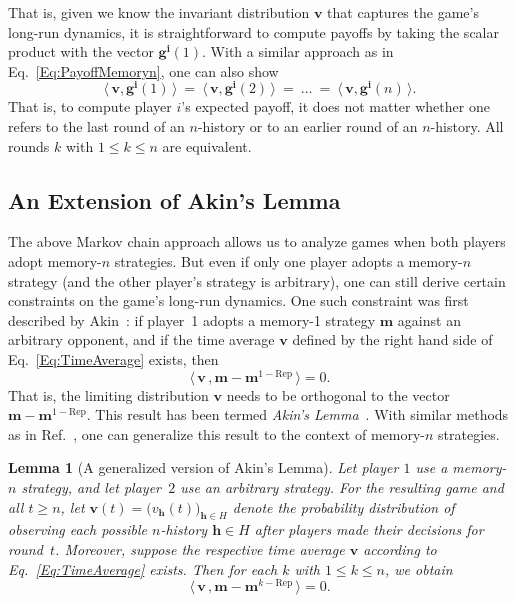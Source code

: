 \documentclass[11pt]{article}
\theoremstyle{plainCl1}
\newtheorem{lemma}{Lemma}
\theoremstyle{plainCl2}
\begin{document}
That is, given we know the invariant distribution $\mathbf{v}$ that captures the game's long-run dynamics, it is straightforward to compute payoffs by taking the scalar product with the vector $\mathbf{g^i}(1)$.
With a similar approach as in Eq.~\eqref{Eq:PayoffMemoryn}, one can also show
\begin{equation} \label{Eq:EquivalencePayoff}
\big\langle\, \mathbf{v}, \mathbf{g^i}(1)\,\big\rangle  
~=~ \big\langle\, \mathbf{v}, \mathbf{g^i}(2)\,\big\rangle
~=~ \ldots
~=~ \big\langle\, \mathbf{v}, \mathbf{g^i}(n)\,\big\rangle.
\end{equation}
That is, to compute player $i$'s expected payoff, it does not matter whether one refers to the last round of an $n$-history or to an earlier round of an $n$-history. All rounds $k$ with $1\!\le\! k\! \le \! n$ are equivalent.



\subsection{An Extension of Akin's Lemma}
The above Markov chain approach allows us to analyze games when both players adopt memory-$n$ strategies. 
But even if only one player adopts a memory-$n$ strategy (and the other player's strategy is arbitrary), one can still  derive certain constraints on the game's long-run dynamics. 
One such constraint was first described by Akin~\citep{akin:EGADS:2016}: 
if player~1 adopts a memory-1 strategy $\mathbf{m}$ against an arbitrary opponent, and if the time average $\mathbf{v}$ defined by the right hand side of Eq.~\eqref{Eq:TimeAverage} exists, then
\begin{equation}
\big\langle\, \mathbf{v}\, , \mathbf{m}-\mathbf{m}^{1-\text{Rep}}\,\big\rangle = 0. 
\end{equation}
That is, the limiting distribution $\mathbf{v}$ needs to be orthogonal to the vector $\mathbf{m}-\mathbf{m}^{1-\text{Rep}}$. 
This result has been termed {\it Akin's Lemma}~\citep{hilbe:PNAS:2014b}. 
With similar methods as in Ref.~\citep{akin:EGADS:2016}, one can generalize this result to the context of memory-$n$ strategies. 


\begin{lemma}[A generalized version of Akin's Lemma]\label{lemma:AkinGeneralised}
Let player $1$ use a memory-$n$ strategy, and let player~$2$ use an arbitrary
strategy. For the resulting game and all $t\!\ge\!n$, let $\mathbf{v}(t)\!=\!\big( v_\mathbf{h}(t) \big)_{\mathbf{h}\in H}$ denote the probability distribution of observing each possible $n$-history $\mathbf{h}\!\in\! H$ after players made their decisions for round~$t$. Moreover, suppose the respective time average $\mathbf{v}$ according to Eq.~\eqref{Eq:TimeAverage} exists. Then for each $k$ with $1\!\le\!k\!\le\!n$, we obtain
\begin{equation} \label{Eq:Akin}
\big\langle\, \mathbf{v}\, , \mathbf{m}-\mathbf{m}^{k-\text{Rep}}\,\big\rangle = 0. 
\end{equation}
\end{lemma}
\end{document}
